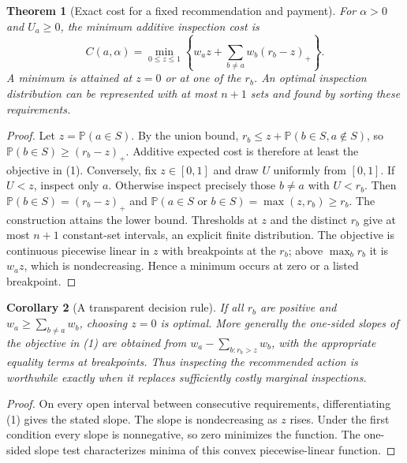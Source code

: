 \documentclass[11pt,a4paper]{article}
\newtheorem{theorem}{Theorem}
\newtheorem{corollary}[theorem]{Corollary}
\newcommand{\Prb}{\mathbb P}
\begin{document}
\begin{theorem}[Exact cost for a fixed recommendation and payment]
For $\alpha>0$ and $U_a\geq0$, the minimum additive inspection cost is
\[
 C(a,\alpha)=\min_{0\leq z\leq1}
       \left\{w_az+\sum_{b\ne a}w_b(r_b-z)_+\right\}.       \tag{1}
\]
A minimum is attained at $z=0$ or at one of the $r_b$. An optimal inspection distribution can be represented with at most $n+1$ sets and found by sorting these requirements.
\end{theorem}
\begin{proof}
Let $z=\Prb(a\in S)$. By the union bound,
$r_b\leq z+\Prb(b\in S,a\notin S)$, so
$\Prb(b\in S)\geq(r_b-z)_+$. Additive expected cost is therefore at least the objective in (1).
Conversely, fix $z\in[0,1]$ and draw $U$ uniformly from $[0,1]$. If $U<z$, inspect only $a$. Otherwise inspect precisely those $b\ne a$ with $U<r_b$. Then
$\Prb(b\in S)=(r_b-z)_+$ and
$\Prb(a\in S\text{ or }b\in S)=\max(z,r_b)\geq r_b$.
The construction attains the lower bound. Thresholds at $z$ and the distinct $r_b$ give at most $n+1$ constant-set intervals, an explicit finite distribution. The objective is continuous piecewise linear in $z$ with breakpoints at the $r_b$; above $\max_b r_b$ it is $w_az$, which is nondecreasing. Hence a minimum occurs at zero or a listed breakpoint.
\end{proof}

\begin{corollary}[A transparent decision rule]
If all $r_b$ are positive and $w_a\geq\sum_{b\ne a}w_b$, choosing $z=0$ is optimal. More generally the one-sided slopes of the objective in (1) are obtained from
$w_a-\sum_{b:r_b>z}w_b$, with the appropriate equality terms at breakpoints. Thus inspecting the recommended action is worthwhile exactly when it replaces sufficiently costly marginal inspections.
\end{corollary}
\begin{proof}
On every open interval between consecutive requirements, differentiating (1) gives the stated slope. The slope is nondecreasing as $z$ rises. Under the first condition every slope is nonnegative, so zero minimizes the function. The one-sided slope test characterizes minima of this convex piecewise-linear function.
\end{proof}
\end{document}
